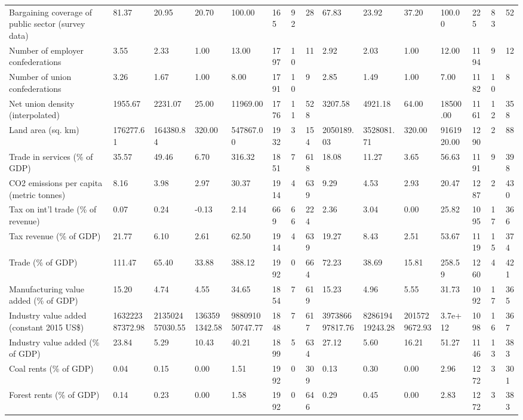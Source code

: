 \begin{longtable}{lllllllllllllll}
\addlinespace
Bargaining coverage of public sector (survey data) & 81.37 & 20.95 & 20.70 & 100.00 & 165 & 92 & 28 & 67.83 & 23.92 & 37.20 & 100.00 & 225 & 83 & 52\\
Number of employer confederations & 3.55 & 2.33 & 1.00 & 13.00 & 1797 & 10 & 11 & 2.92 & 2.03 & 1.00 & 12.00 & 1194 & 9 & 12\\
Number of union confederations & 3.26 & 1.67 & 1.00 & 8.00 & 1791 & 10 & 9 & 2.85 & 1.49 & 1.00 & 7.00 & 1182 & 10 & 8\\
Net union density (interpolated) & 1955.67 & 2231.07 & 25.00 & 11969.00 & 1776 & 11 & 528 & 3207.58 & 4921.18 & 64.00 & 18500.00 & 1161 & 12 & 358\\
Land area (sq. km) & 176277.61 & 164380.84 & 320.00 & 547867.00 & 1932 & 3 & 154 & 2050189.03 & 3528081.71 & 320.00 & 9161920.00 & 1290 & 2 & 88\\
\addlinespace
Trade in services (\% of GDP) & 35.57 & 49.46 & 6.70 & 316.32 & 1851 & 7 & 618 & 18.08 & 11.27 & 3.65 & 56.63 & 1191 & 9 & 398\\
CO2 emissions per capita (metric tonnes) & 8.16 & 3.98 & 2.97 & 30.37 & 1914 & 4 & 639 & 9.29 & 4.53 & 2.93 & 20.47 & 1287 & 2 & 430\\
Tax on int'l trade (\% of revenue) & 0.07 & 0.24 & -0.13 & 2.14 & 669 & 66 & 224 & 2.36 & 3.04 & 0.00 & 25.82 & 1095 & 17 & 366\\
Tax revenue (\% of GDP) & 21.77 & 6.10 & 2.61 & 62.50 & 1914 & 4 & 639 & 19.27 & 8.43 & 2.51 & 53.67 & 1119 & 15 & 374\\
Trade (\% of GDP) & 111.47 & 65.40 & 33.88 & 388.12 & 1992 & 0 & 664 & 72.23 & 38.69 & 15.81 & 258.59 & 1260 & 4 & 421\\
\addlinespace
Manufacturing value added (\% of GDP) & 15.20 & 4.74 & 4.55 & 34.65 & 1854 & 7 & 619 & 15.23 & 4.96 & 5.55 & 31.73 & 1092 & 17 & 365\\
Industry value added (constant 2015 US\$) & 163222387372.98 & 213502457030.55 & 1363591342.58 & 988091050747.77 & 1848 & 7 & 617 & 397386697817.76 & 828619419243.28 & 2015729672.93 & 3.7e+12 & 1098 & 16 & 367\\
Industry value added (\% of GDP) & 23.84 & 5.29 & 10.43 & 40.21 & 1899 & 5 & 634 & 27.12 & 5.60 & 16.21 & 51.27 & 1146 & 13 & 383\\
Coal rents (\% of GDP) & 0.04 & 0.15 & 0.00 & 1.51 & 1992 & 0 & 309 & 0.13 & 0.30 & 0.00 & 2.96 & 1272 & 3 & 301\\
Forest rents (\% of GDP) & 0.14 & 0.23 & 0.00 & 1.58 & 1992 & 0 & 646 & 0.29 & 0.45 & 0.00 & 2.83 & 1272 & 3 & 383\\

\end{longtable}
